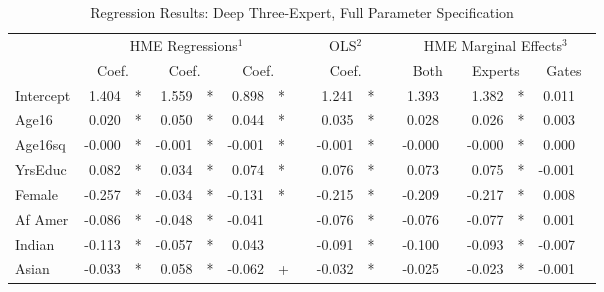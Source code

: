 \documentclass[12pt]{article}
\begin{document}
\begin{landscape}
  \begin{table} \centering
    \caption{Regression Results: Deep Three-Expert, Full Parameter Specification}
      \begin{threeparttable}
        \begin{tabular}[l]{l r l r l r l c r l c r l r l r l}
  
  \cmidrule{1-17}
  & \multicolumn{6}{c}{HME Regressions$^{1}$} &&  \multicolumn{2}{c}{OLS$^{2}$} && \multicolumn{6}{c}{HME Marginal Effects$^{3}$} \\
  \cmidrule(l){2-7}    \cmidrule(l){9-10}     \cmidrule(l){12-17}
  & \multicolumn{2}{c}{Coef.} &  \multicolumn{2}{c}{Coef.} &  \multicolumn{2}{c}{Coef.}  && \multicolumn{2}{c}{Coef.} && \multicolumn{2}{c}{Both}    &  \multicolumn{2}{c}{Experts}  &  \multicolumn{2}{c}{Gates} \\
                  \cmidrule(l){2-3} \cmidrule(l){4-5} \cmidrule(l){6-7} \cmidrule(l){9-10} \cmidrule(l){12-13} \cmidrule(l){14-15} \cmidrule(l){16-17}
  Intercept       &  1.404 & *      &  1.559 & *      &  0.898 & *      &&  1.241 & *     &&  1.393 &          &  1.382 & *        &  0.011 &        \\
  Age16           &  0.020 & *      &  0.050 & *      &  0.044 & *      &&  0.035 & *     &&  0.028 &          &  0.026 & *        &  0.003 &        \\
  Age16sq         & -0.000 & *      & -0.001 & *      & -0.001 & *      && -0.001 & *     && -0.000 &          & -0.000 & *        &  0.000 &        \\
  YrsEduc         &  0.082 & *      &  0.034 & *      &  0.074 & *      &&  0.076 & *     &&  0.073 &          &  0.075 & *        & -0.001 &        \\
  Female          & -0.257 & *      & -0.034 & *      & -0.131 & *      && -0.215 & *     && -0.209 &          & -0.217 & *        &  0.008 &        \\
  Af Amer         & -0.086 & *      & -0.048 & *      & -0.041 &        && -0.076 & *     && -0.076 &          & -0.077 & *        &  0.001 &        \\
  Indian          & -0.113 & *      & -0.057 & *      &  0.043 &        && -0.091 & *     && -0.100 &          & -0.093 & *        & -0.007 &        \\
  Asian           & -0.033 & *      &  0.058 & *      & -0.062 & +      && -0.032 & *     && -0.025 &          & -0.023 & *        & -0.001 &        \\

\end{tabular}
\end{threeparttable}
\end{table}
\end{landscape}
\end{document}
